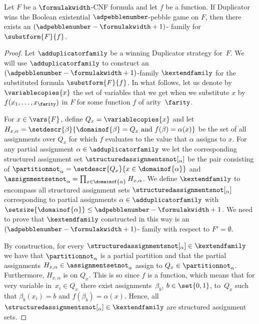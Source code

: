 \begin{lemma}
  \label{lem:substitution}
  Let $F$ be a $\formulakwidth$-CNF formula and let $f$ be a
  \nonauthor{} function.
%
  If Duplicator wins the
  Boolean existential $\adpebblenumber$-pebble game on $F$, then there
  exists an $(\adpebblenumber - \formulakwidth + 1)$-\kextendibleNok{}
  family for 
%
  $\substform{F}{f}$.
%
%
%
\end{lemma}

\begin{proof}
  Let $\adduplicatorfamily$ be a winning Duplicator strategy for~$F$. 
  We will use 
  $\adduplicatorfamily$
  to construct an 
  $(\adpebblenumber - \formulakwidth + 1)$-\kextendibleNok family 
  $\kextendfamily$ for the substituted formula
  $\substform{F}{f}$. 
  In what follows, let us denote by
  $\variablecopies{x}$ 
  the set of
  variables that we get when we substitute $x$ by 
  $f (x_1, \ldots, x_{\farity})$ in $F$ 
  for some \nonauthor function $f$ of arity~$\farity$.

%
%
%
%
%
%
%
%
%
%
%
%
%
%
%
%
%
%
%
%
%
%
%
%
%
%
%

  For $x \in \vars{F}$,
  define
  $Q_x = \variablecopies{x}$
  and let
  $H_{x,\alpha} = 
  \setdescr{\beta}{\domainof{\beta} = Q_x \text{ and } f(\beta) = \alpha(x)}
%
%
  $
  be the set of all assignments over
  $Q_x$ for which $f$ evaluates to the value that $\alpha$ assigns to $x$.
  For any partial assignment 
  $\alpha \in \adduplicatorfamily$
  we let the corresponding structured assignment set
  $\structuredassignmentsnot[_\alpha]$ be the pair 
  consisting
  of $\partitionnot_\alpha =
  \setdescr{Q_x}{x \in \domainof{\alpha}}$ 
  and 
  $\assignmentsetnot_\alpha = \prod_{x \in \domainof{\alpha}} H_{x,\alpha}$.
  We define $\kextendfamily$ to encompass all
  structured assignment sets 
  $\structuredassignmentsnot[_\alpha]$ 
  corresponding to partial assignments 
  $\alpha \in \adduplicatorfamily$
  with 
  $\setsize{\domainof{\alpha}} \leq \adpebblenumber - \formulakwidth + 1$.
  We need to prove that
  $\kextendfamily$ 
  constructed in this way is an 
  $(\adpebblenumber - \formulakwidth + 1)$-\kextendibleNok 
  family with respect to 
  $F' = \emptyset$. 
  
%
%
%
%
%
%
%
%
%
%
%
%
  By construction, for every
  $\structuredassignmentsnot[_\alpha] \in \kextendfamily$
  we have that 
  $\partitionnot_\alpha$ 
  is a partial partition and that the partial assignments
  $H_{x,\alpha} \in \assignmentsetnot_\alpha$ 
  assign to 
  $Q_x \in \partitionnot_\alpha$.
  Furthermore, 
  $H_{x,\alpha}$ is \flippable on $Q_x$.
  This is so since 
  $f$ is a \nonauthor{} function, which means that 
%
%
  for very variable in~$x_i \in Q_x$
  there exist assignments~$\beta_b$, $b \in \set{0,1}$,
  to~$Q_x$
  such that $\beta_b(x_i) = b$
  and
  $f(\beta_b) = \alpha(x)$.
  Hence, all  
  $\structuredassignmentsnot[_\alpha] \in \kextendfamily$
  are structured assignment sets.



\end{proof}

